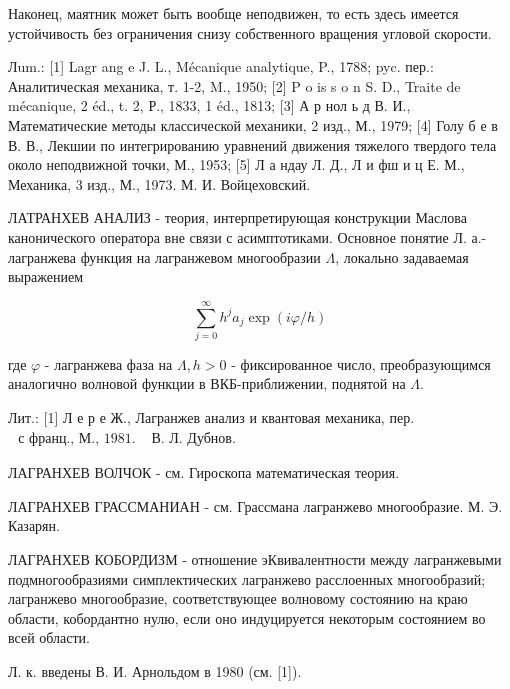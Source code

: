\documentclass[10pt]{article}
\begin{document}
Наконец, маятник может быть вообще неподвижен, то есть здесь имеется устойчивость без ограничения снизу собственного вращения угловой скорости.



Лum.: [1] Lagr ang e J. L., Mécanique analytique, P., 1788; pyc. пер.: Аналитическая механика, т. 1-2, M., 1950; [2] P o is s o n S. D., Traite de mécanique, 2 éd., t. 2, Р., 1833, 1 éd., 1813; [3] А р нол ь д В. И., Математические методы классической механики, 2 изд., М., 1979; [4] Голу б е в В. В., Лекшии по интегрированию уравнений движения тяжелого твердого тела около неподвижной точки, М., 1953; [5] Л а ндау Л. Д., Л и фш и ц Е. М., Механика, 3 изд., М., 1973. М. И. Войцеховский.



ЛАТРАНХЕВ АНАЛИЗ - теория, интерпретирующая конструкции Маслова канонического оператора вне связи с асимптотиками. Основное понятие Л. а.- лагранжева функция на лагранжевом многообразии $\Lambda$, локально задаваемая выражением



\[

\sum_{j=0}^{\infty} h^{j} a_{j} \exp (i \varphi / h)

\]



где $\varphi$ - лагранжева фаза на $\Lambda, h>0$ - фиксированное число, преобразующимся аналогично волновой функции в ВКБ-приближении, поднятой на $\Lambda$.



Лит.: [1] Л е р е Ж., Лагранжев анализ и квантовая механика, пер. $\begin{array}{ll}\text { с франц., М., } 1981 . & \text { В. Л. Дубнов. }\end{array}$



ЛАГРАНХЕВ ВОЛЧОК - см. Гироскопа математическая теория.



ЛАГРАНХЕВ ГРАССМАНИАН - см. Грассмана лагранжево многообразие. М. Э. Казарян.



ЛАГРАНХЕВ КОБОРДИЗМ - отношение эКвивалентности между лагранжевыми подмногообразиями симплектических лагранжево расслоенных многообразий; лагранжево многообразие, соответствующее волновому состоянию на краю области, кобордантно нулю, если оно индуцируется некоторым состоянием во всей области.



Л. к. введены В. И. Арнольдом в 1980 (см. [1]).
\end{document}
